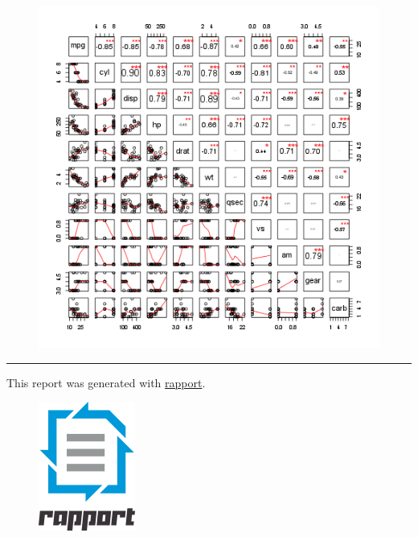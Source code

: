\documentclass[]{article}
\makeatletter
\def\maxwidth{\ifdim\Gin@nat@width>\linewidth\linewidth
\else\Gin@nat@width\fi}
\let\Oldincludegraphics\includegraphics
\renewcommand{\includegraphics}[1]{\Oldincludegraphics[width=\maxwidth]{#1}}
\makeatother
\begin{document}
\begin{figure}[htbp]
\centering
\includegraphics{ce42e944b62284a3bebf2101155af100.png}
\caption{}
\end{figure}

\begin{center}\rule{3in}{0.4pt}\end{center}

This report was generated with
\href{http://rapport-package.info/}{rapport}.

\begin{figure}[htbp]
\centering
\includegraphics{images/rapport.png}
\caption{}
\end{figure}
\end{document}
